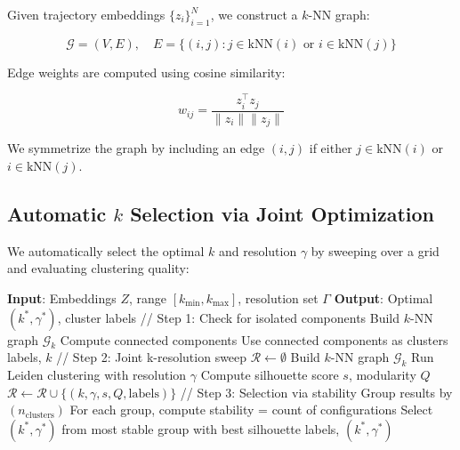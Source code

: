 \documentclass{article}
\begin{document}
Given trajectory embeddings $\{z_i\}_{i=1}^{N}$, we construct a $k$-NN graph:

\begin{equation}
    \mathcal{G} = (V, E), \quad E = \{(i, j) : j \in \text{kNN}(i) \text{ or } i \in \text{kNN}(j)\}
\end{equation}

Edge weights are computed using cosine similarity:

\begin{equation}
    w_{ij} = \frac{z_i^\top z_j}{\|z_i\| \|z_j\|}
\end{equation}

We symmetrize the graph by including an edge $(i,j)$ if either $j \in \text{kNN}(i)$ or $i \in \text{kNN}(j)$.

\subsection{Automatic $k$ Selection via Joint Optimization}

We automatically select the optimal $k$ and resolution $\gamma$ by sweeping over a grid and evaluating clustering quality:

\begin{algorithm}[H]
\caption{Joint $k$-Resolution Selection}
\begin{algorithmic}[1]
\STATE \textbf{Input}: Embeddings $Z$, range $[k_{\min}, k_{\max}]$, resolution set $\Gamma$
\STATE \textbf{Output}: Optimal $(k^*, \gamma^*)$, cluster labels
\STATE
\STATE // Step 1: Check for isolated components
    \STATE Build $k$-NN graph $\mathcal{G}_k$
    \STATE Compute connected components
        \STATE Use connected components as clusters
        \RETURN labels, $k$
    \ENDIF
\ENDFOR
\STATE
\STATE // Step 2: Joint k-resolution sweep
\STATE $\mathcal{R} \leftarrow \emptyset$ 
    \STATE Build $k$-NN graph $\mathcal{G}_k$
    \FOR{$\gamma \in \Gamma$}
        \STATE Run Leiden clustering with resolution $\gamma$
        \STATE Compute silhouette score $s$, modularity $Q$
        \STATE $\mathcal{R} \leftarrow \mathcal{R} \cup \{(k, \gamma, s, Q, \text{labels})\}$
    \ENDFOR
\ENDFOR
\STATE
\STATE // Step 3: Selection via stability
\STATE Group results by $(n_{\text{clusters}})$
\STATE For each group, compute stability = count of configurations
\STATE Select $(k^*, \gamma^*)$ from most stable group with best silhouette
\RETURN labels, $(k^*, \gamma^*)$
\end{algorithmic}
\end{algorithm}
\end{document}

